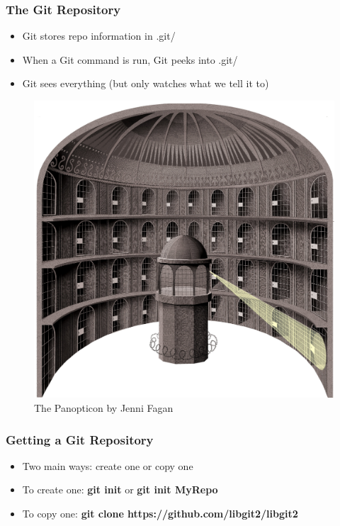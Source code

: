 \documentclass{beamer}
\begin{document}
\begin{frame}
	\frametitle{The Git Repository}
	\begin{itemize}
		\item{Git stores repo information in .git/}
		\item{When a Git command is run, Git peeks into .git/}
		\item{Git sees everything (but only watches what we tell it to)}
	\end{itemize}
	\begin{figure}
		\includegraphics[scale=0.5]{panopticon.jpg}
		\caption{The Panopticon by Jenni Fagan}
	\end{figure}
\end{frame}

\begin{frame}
	\frametitle{Getting a Git Repository}
	\begin{itemize}
		\item{Two main ways: create one or copy one}
		\item{To create one: \textbf{git init} or \textbf{git init MyRepo}}
		\item{To copy one: \textbf{git clone https://github.com/libgit2/libgit2}}
	\end{itemize}

\end{frame}
\end{document}
